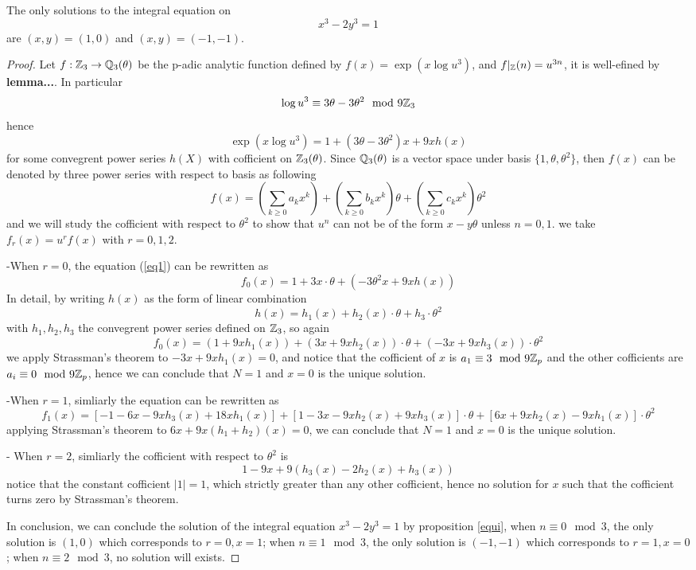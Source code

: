     \begin{theorem} \label{x3-2y3=1}
        The only solutions to the integral equation on
\[
x^{3}-2y^{3}=1
\]
are\/ $(x,y)=(1,0)$ and\/ $(x,y)=(-1,-1)$.

    \begin{proof}
         Let \(f: \mathbb{Z}_3 \to \mathbb{Q}_3(\theta)\) be the p-adic analytic function defined by \(f(x) = \exp({x\log{u^3}})\), and \(f|_{\mathbb{Z}}(n) = u^{3n}\), it is well-efined by \textbf{lemma...}. In particular
         \[\log{u^3} \equiv  3\theta-3\theta^2 \mod{9 \mathbb{Z}_3}\]
         hence 
         \begin{equation} \label{eq1}
            \exp(x \log u^3) = 1 + (3\theta-3\theta^2)x+9xh(x)
         \end{equation}
         for some convegrent power series \(h(X)\) with cofficient on \(\mathbb{Z}_3(\theta)\). Since \(\mathbb{Q}_3(\theta)\) is a vector space under basis \(\{1, \theta, \theta^2\}\), then \(f(x)\) can be denoted by three power series with respect to basis as following
         \[f(x) = (\sum_{k \geq 0}a_kx^k)+(\sum_{k \geq 0}b_kx^k)\theta + (\sum_{k \geq 0}c_kx^k)\theta^2\]
         and we will study the cofficient with respect to \(\theta^2\) to show that \(u^n\) can not be of the form \(x-y \theta\) unless \(n=0,1\). we take \(f_r(x) = u^{r}f(x)\) with \(r=0,1,2\).

         -When \(r=0\), the equation (\ref{eq1}) can be rewritten as
         \[f_0(x) = 1+ 3x\cdot \theta + (-3\theta^2x+9xh(x))\]
         In detail, by writing \(h(x)\) as the form of linear combination
         \[h(x) = h_1(x)+h_2(x)\cdot\theta + h_3 \cdot \theta^2\]
         with \(h_1,h_2,h_3\) the convegrent power series defined on \(\mathbb{Z}_3\), so again
         \[f_0(x) = (1+9xh_1(x)) + (3x+9xh_2(x))\cdot \theta + (-3x+9xh_3(x)) \cdot \theta^2\]
         we apply Strassman's theorem to \(-3x+9xh_1(x) = 0\), and notice that the cofficient of \(x\) is \(a_1 \equiv 3 \mod 9\mathbb{Z}_p\) and the other cofficients are \(a_i \equiv 0 \mod 9\mathbb{Z}_p \), hence we can conclude that \(N=1\) and \(x=0\) is the unique solution.
         
         -When \(r=1\), simliarly the equation can be rewritten as
         \[f_1(x) = [-1-6x-9xh_3(x)+18xh_1(x)]+[1-3x-9xh_2(x)+9xh_3(x)]\cdot \theta + [6x+9xh_2(x)-9xh_1(x)]\cdot \theta^2\]
         applying Strassman's theorem to \(6x+9x(h_1+h_2)(x) = 0\), we can conclude that \(N=1\) and \(x=0\) is the unique solution.

         - When \(r=2\), simliarly the cofficient with respect to \(\theta^2\) is \[1-9x+9(h_3(x)-2h_2(x)+h_3(x)) \]
         notice that the constant cofficient \(|1| = 1\), which strictly greater than any other cofficient, hence no solution for \(x\) such that the cofficient turns zero by Strassman's theorem.

         In conclusion, we can conclude the solution of the integral equation \(x^3-2y^3=1\) by proposition \ref{equi}, when \(n \equiv 0 \mod 3\),  the only solution is \((1,0)\) which corresponds to \(r=0, x=1\); when \(n \equiv 1 \mod 3\), the only solution is \((-1,-1)\) which corresponds to \(r=1,x=0\); when \(n \equiv 2 \mod 3\), no solution will exists.
    \end{proof}
    \end{theorem}


